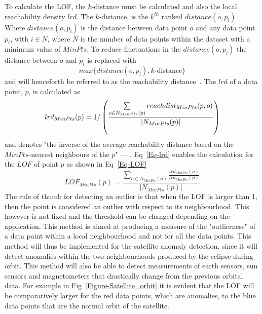 To calculate the LOF, the $k$-distance must be calculated and also the local reachability density \(lrd\). The $k$-distance, is the $k^{th}$ ranked $distance(o,p_i)$. Where $distance(o,p_i)$ is the distance between data point $o$ and any data point $p_i$, with $i \in N$, where $N$ is the number of data points within the dataset with a minimum value of $MinPts$. To reduce fluctuations in the $distance(o,p_i)$ the distance between $o$ and $p_i$ is replaced with 
\begin{equation}
max \{distance(o,p_i), k\text{-distance}\} 
\end{equation}
and will henceforth be referred to as the reachability distance~\cite{breunig2000lof}. The $lrd$ of a data point, $p$, is calculated as 
\begin{equation}
lrd_{MinPts}(p) = 1/\left(\frac{\sum\limits_{o \in N_{MinPts}(p)}^{} reach\-dist_{MinPts}(p,o)}{|N_{MinPts}(p)|}\right)
\label{Eq-lrd}
\end{equation}
and denotes "the inverse of the average reachability distance based on the $MinPts$-nearest neighbours of the $p$" --- \cite{breunig2000lof}. Eq~\ref{Eq-lrd} enables the calculation for the $LOF$ of point $p$ as shown in Eq~\ref{Eq-LOF}
\begin{equation}
LOF_{MinPts}(p) = \frac{\sum\limits_{o \in N_{MinPts}(p)}^{}\frac{lrd_{MinPts}(o)}{lrd_{MinPts}(p)}}{|N_{MinPts}(p)|}
\label{Eq-LOF}
\end{equation}
The rule of thumb for detecting an outlier is that when the LOF is larger than 1, then the point is considered an outlier with respect to its neighbourhood. This however is not fixed and the threshold can be changed depending on the application.
This method is aimed at producing a measure of the "outlierness" of a data point within a local neighbourhood and not for all the data points. This method will thus be implemented for the satellite anomaly detection, since it will detect anomalies within the two neighbourhoods produced by the eclipse during orbit. This method will also be able to detect measurements of earth sensors, sun sensors and magnetometers that drastically change from the previous orbital data. For example in Fig~\ref{Figure-Satellite_orbit} it is evident that the LOF will be comparatively larger for the red data points, which are anomalies, to the blue data points that are the normal orbit of the satellite.

